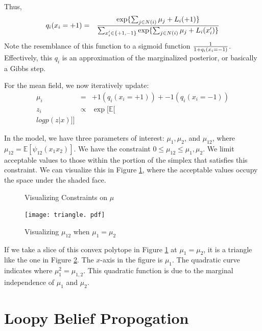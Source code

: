 \documentclass[twoside]{article}
\begin{document}
Thus,  
\begin{eqnarray*}
q_i(x_i=+1) &=& { \exp\{ \sum_{j \in N(i)} \mu_j + L_i(+1) \}   \over \sum_{x_i^{\prime} \in \{ +1,  -1\}} \exp \{ \sum_{j \in N(i)} \mu_j + L_i(x_i^{\prime}) \} }
\end{eqnarray*}
Note the resemblance of this function to a sigmoid function $1 \over 1+q_i(x_i=-1)$.  Effectively,  this $q_i$ is an approximation of the marginalized posterior,  or basically a Gibbs step. 

For the mean field,  we now iteratively update:
\begin{eqnarray*}
\mu_i &=& +1 (q_i(x_i=+1)) + -1 (q_i(x_i=-1)) \\
z_i &\propto& \exp[ \mathbb{E}[ \\log p(z|x)]]
\end{eqnarray*}

In the model,  we have three parameters of interest: $\mu_1,  \mu_2$,  and $\mu_{12}$,  where $\mu_{12}=\mathbb{E}[\psi_{12}(x_1 x_2)]$.  We have the constraint $0 \leq \mu_{12} \leq \mu_1,  \mu_2$.  We limit acceptable values to those within the portion of the simplex that satisfies this constraint.  We can visualize this in Figure \ref{mu},  where the acceptable values occupy the space under the shaded face.  

\begin{figure}[h!]
\begin{center}
\setlength{\fboxsep}{0pt}
\setlength{\fboxrule}{1pt}
\caption{Visualizing Constraints on $\mu$}
\label{mu}
\end{center}
\end{figure}


\begin{figure}[h!]
\begin{center}
\texttt{[image: triangle. pdf]}
\caption{Visualizing $\mu_{12}$ when $\mu_1=\mu_2$}
\label{mu2}
\end{center}
\end{figure}

If we take a slice of this convex polytope in Figure \ref{mu} at $\mu_1=\mu_2$,  it is a triangle like the one in Figure \ref{mu2}.  The $x$-axis in the figure is $\mu_1$.  The quadratic curve indicates where $\mu_1^2=\mu_{1, 2}$.  This quadratic function is due to the marginal independence of $\mu_1$ and $\mu_2$.  



\section{Loopy Belief Propogation}
\end{document}
